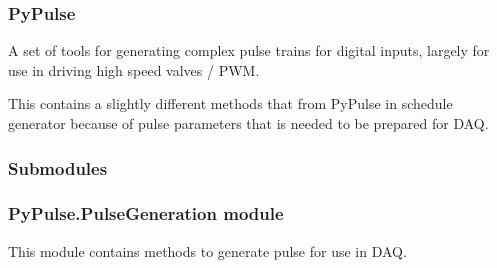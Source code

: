 \documentclass[letterpaper,10pt,english]{sphinxmanual}
\begin{document}
\subsubsection{PyPulse}
\label{\detokenize{NoSeMazeControl/PyPulse:pypulse}}
\sphinxAtStartPar
A set of tools for generating complex pulse trains for digital inputs, largely for use in driving high speed valves / PWM.

\sphinxAtStartPar
This contains a slightly different methods that from PyPulse in schedule generator because of pulse parameters that is needed to be prepared for DAQ.


\subsubsection{Submodules}
\label{\detokenize{NoSeMazeControl/PyPulse:submodules}}

\subsubsection{PyPulse.PulseGeneration module}
\label{\detokenize{NoSeMazeControl/PyPulse:module-PyPulse.PulseGeneration}}\label{\detokenize{NoSeMazeControl/PyPulse:pypulse-pulsegeneration-module}}
\sphinxAtStartPar
This module contains methods to generate pulse for use in DAQ.

\begin{fulllineitems}
\label{\detokenize{NoSeMazeControl/PyPulse:PyPulse.PulseGeneration.concatenated_pulse}}
\pysigstartsignatures
{}
\pysigstopsignatures
\end{fulllineitems}


\begin{fulllineitems}
\label{\detokenize{NoSeMazeControl/PyPulse:PyPulse.PulseGeneration.dummy_noise_pulse}}
\pysigstartsignatures
{}
\pysigstopsignatures
\end{fulllineitems}
\end{document}
